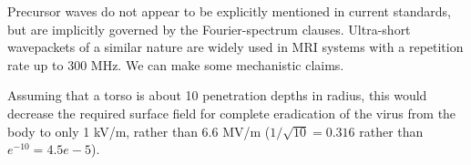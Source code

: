 \documentclass[paper.tex]{subfiles}
\begin{document}
Precursor waves do not appear to be explicitly mentioned in current standards, but are implicitly governed by the Fourier-spectrum clauses. Ultra-short wavepackets of a similar nature are widely used in MRI systems with a repetition rate up to 300 MHz. We can make some mechanistic claims.

Assuming that a torso is about 10 penetration depths in radius, this would decrease the required surface field for complete eradication of the virus from the body to only 1 kV/m, rather than 6.6 MV/m ($1/\sqrt{10}=0.316$ rather than $e^{-10}=4.5e-5$). 
\end{document}
